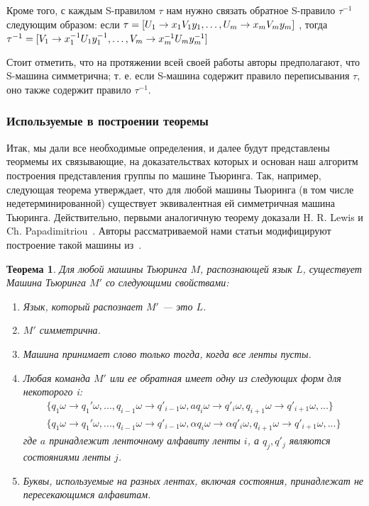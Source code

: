 \documentclass[14pt]{matmex-diploma-custom}
\newtheorem{thm}{Теорема}[subsection]
\begin{document}
Кроме того, с каждым S-правилом $ \tau $ нам нужно связать обратное 
S-правило $ \tau^{-1} $ следующим образом:
если
$\\ \tau = [U_1 \to x_1 V_1 y_1, \dots, U_m \to x_m V_m y_m]$
, тогда
$\\ \tau^{-1} = [V_1 \to x_1^{-1} U_1 y_1^{-1}, \dots, V_m \to x_m^{-1} U_m y_m^{-1}]$

Стоит отметить, что на протяжении всей своей работы авторы предполагают, что
S-машина симметрична; т. е. если S-машина содержит
правило переписывания $ \tau $, оно также содержит правило $ \tau^{-1} $.

\subsubsection{Используемые в построении теоремы}

Итак, мы дали все необходимые определения, и далее будут представлены теормемы их связывающие,
на доказательствах которых и основан наш алгоритм построения представления группы по машине Тьюринга.
Так, например, следующая теорема утверждает, что для любой машины Тьюринга (в том числе недетерминированной) существует эквивалентная ей симметричная машина Тьюринга. Действительно, 
первыми аналогичную теорему доказали H. R. Lewis и Ch. Papadimitriou~\cite{LEWIS1982161}. 
Авторы рассматриваемой нами статьи модифицируют построение такой машины из~\cite{symTM}.

\begin{thm} \label{symthm}
Для любой машины Тьюринга $M$, распознающей язык $L$, существует
Машина Тьюринга $M'$ со следующими свойствами:
\begin{enumerate}
    \item Язык, который распознает $M'$ --- это $L$.
    \item $M'$ симметрична.
    \item Машина принимает слово только тогда, когда все ленты пусты.
    \item Любая команда $M'$ или ее обратная имеет одну из следующих форм для некоторого i:
    \begin{align}
        \{q_1\omega \to q_1'\omega, ..., q_{i−1}\omega \to q′_{i−1}\omega, 
        aq_i\omega \to q′_i\omega, q_{i+1}\omega \to q′_{i+1}\omega, ...\} \label{symType1} \\
        \{q_1\omega \to q_1'\omega, ..., q_{i−1}\omega \to q′_{i−1}\omega, 
        \alpha q_i\omega \to \alpha q′_i\omega, q_{i+1}\omega \to q′_{i+1}\omega, ...\} \label{symType2}
    \end{align}
    где $a$ принадлежит ленточному алфавиту ленты $i$, а $q_j, q′_j$ являются состояниями ленты $j$.
    \item Буквы, используемые на разных лентах, включая состояния, принадлежат не пересекающимся алфавитам.
\end{enumerate}
\end{thm}
\end{document}
